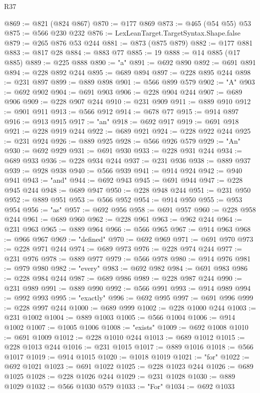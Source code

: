 \begin{lexlean}{R37}
\begin{coremodule}
@869 := @821 (@824 @867)
@870 := @177 @869
@873 := @465 (@54 @55) @53
@875 := @566 @230 @232
@876 := LexLeanTarget.TargetSyntax.Shape.false
@879 := @265 @876 @53 @244
@881 := @873 (@875 @879)
@882 := @177 @881
@883 := @817 @28
@884 := @883 @77
@885 := 19
@888 := @14 @885 (@17 @885)
@889 := @225 @888
@890 := "a"
@891 := @692 @890
@892 := @691 @891
@894 := @228 @892 @244
@895 := @689 @894
@897 := @228 @895 @244
@898 := @231 @897
@899 := @889 @898
@901 := @566 @899 @579
@902 := "A"
@903 := @692 @902
@904 := @691 @903
@906 := @228 @904 @244
@907 := @689 @906
@909 := @228 @907 @244
@910 := @231 @909
@911 := @889 @910
@912 := @901 @911
@913 := @566 @912
@914 := @678 @77
@915 := @914 @897
@916 := @913 @915
@917 := "an"
@918 := @692 @917
@919 := @691 @918
@921 := @228 @919 @244
@922 := @689 @921
@924 := @228 @922 @244
@925 := @231 @924
@926 := @889 @925
@928 := @566 @926 @579
@929 := "An"
@930 := @692 @929
@931 := @691 @930
@933 := @228 @931 @244
@934 := @689 @933
@936 := @228 @934 @244
@937 := @231 @936
@938 := @889 @937
@939 := @928 @938
@940 := @566 @939
@941 := @914 @924
@942 := @940 @941
@943 := "and"
@944 := @692 @943
@945 := @691 @944
@947 := @228 @945 @244
@948 := @689 @947
@950 := @228 @948 @244
@951 := @231 @950
@952 := @889 @951
@953 := @566 @952
@954 := @914 @950
@955 := @953 @954
@956 := "as"
@957 := @692 @956
@958 := @691 @957
@960 := @228 @958 @244
@961 := @689 @960
@962 := @228 @961
@963 := @962 @244
@964 := @231 @963
@965 := @889 @964
@966 := @566 @965
@967 := @914 @963
@968 := @966 @967
@969 := "defined"
@970 := @692 @969
@971 := @691 @970
@973 := @228 @971 @244
@974 := @689 @973
@976 := @228 @974 @244
@977 := @231 @976
@978 := @889 @977
@979 := @566 @978
@980 := @914 @976
@981 := @979 @980
@982 := "every"
@983 := @692 @982
@984 := @691 @983
@986 := @228 @984 @244
@987 := @689 @986
@989 := @228 @987 @244
@990 := @231 @989
@991 := @889 @990
@992 := @566 @991
@993 := @914 @989
@994 := @992 @993
@995 := "exactly"
@996 := @692 @995
@997 := @691 @996
@999 := @228 @997 @244
@1000 := @689 @999
@1002 := @228 @1000 @244
@1003 := @231 @1002
@1004 := @889 @1003
@1005 := @566 @1004
@1006 := @914 @1002
@1007 := @1005 @1006
@1008 := "exists"
@1009 := @692 @1008
@1010 := @691 @1009
@1012 := @228 @1010 @244
@1013 := @689 @1012
@1015 := @228 @1013 @244
@1016 := @231 @1015
@1017 := @889 @1016
@1018 := @566 @1017
@1019 := @914 @1015
@1020 := @1018 @1019
@1021 := "for"
@1022 := @692 @1021
@1023 := @691 @1022
@1025 := @228 @1023 @244
@1026 := @689 @1025
@1028 := @228 @1026 @244
@1029 := @231 @1028
@1030 := @889 @1029
@1032 := @566 @1030 @579
@1033 := "For"
@1034 := @692 @1033

\end{coremodule}
\end{lexlean}
